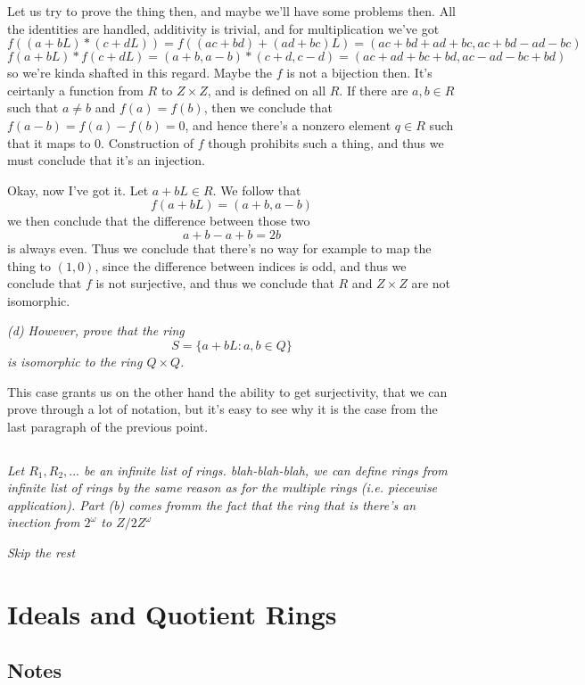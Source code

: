 \documentclass[11pt,oneside,titlepage]{book}
\newcommand{\set}[1]{\{ #1 \}}
\begin{document}
Let us try to prove the thing then, and maybe we'll have some problems
then. All the identities are handled, additivity is trivial, and for
multiplication we've got
$$f((a + bL) * (c + dL)) = f((ac + bd) + (ad + bc)L)
= (ac + bd + ad + bc, ac + bd - ad - bc)$$
$$f(a + bL) * f(c + dL) = (a + b, a - b) * (c + d, c - d)
= (ac + ad + bc + bd, ac - ad - bc + bd)$$ so we're kinda shafted in
this regard. Maybe the $f$ is not a bijection then. It's ceirtanly a
function from $R$ to $Z \times Z$, and is defined on all $R$. If there
are $a, b \in R$ such that $a \neq b$ and $f(a) = f(b)$, then we
conclude that $f(a - b) = f(a) - f(b) = 0$, and hence there's a
nonzero element $q \in R$ such that it maps to $0$. Construction of
$f$ though prohibits such a thing, and thus we must conclude that it's
an injection.

Okay, now I've got it. Let $a + bL \in R$. We follow that
$$f(a + bL) = (a + b, a - b)$$
we then conclude that the difference between those two
$$a + b - a + b = 2b$$
is always even. Thus we conclude that there's no way for example to
map the thing to $(1, 0)$, since the difference between indices is
odd, and thus we conclude that $f$ is not surjective, and thus we
conclude that $R$ and $Z \times Z$ are not isomorphic.

\textit{(d) However, prove that the ring
  $$S = \set{a + bL: a, b \in Q}$$
  is isomorphic to the ring $Q \times Q$.  }

This case grants us on the other hand the ability to get surjectivity,
that we can prove through a lot of notation, but it's easy to see why
it is the case from the last paragraph of the previous point.

\subsection{}

\textit{Let $R_1, R_2, ...$ be an infinite list of
rings. blah-blah-blah, we can define rings from infinite list of rings
by the same reason as for the multiple rings (i.e. piecewise
application). Part (b) comes fromm the fact that the ring that is
there's an inection from $2^\omega$ to $Z/2Z^\omega$}

\textit{Skip the rest}

\section{Ideals and Quotient Rings}

\subsection*{Notes}
\end{document}
